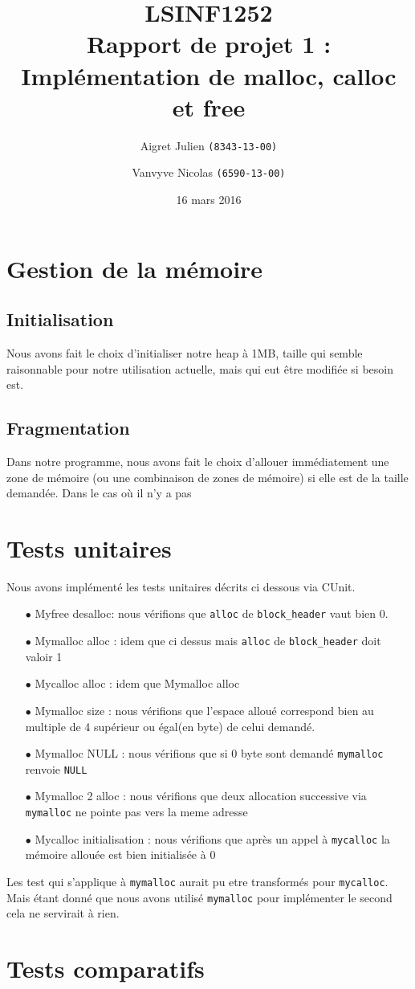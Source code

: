 \documentclass[10pt,a4paper]{article}
\author{Aigret Julien \texttt{(8343-13-00)}\and Vanvyve Nicolas \texttt{(6590-13-00)}}
\date{16 mars 2016}
\title{LSINF1252\\Rapport de projet 1 :\\Implémentation de malloc, calloc et free}
\begin{document}
\maketitle

\section{Gestion de la mémoire}
\subsection{Initialisation}
Nous avons fait le choix d'initialiser notre heap à 1MB, taille qui semble raisonnable pour notre utilisation actuelle, mais qui eut être modifiée si besoin est.

\subsection{Fragmentation}
Dans notre programme, nous avons fait le choix d'allouer immédiatement une zone de mémoire (ou une combinaison de zones de mémoire) si elle est de la taille demandée. Dans le cas où il n'y a pas
\section{Tests unitaires}


Nous avons implémenté les tests unitaires décrits ci dessous via CUnit. 
\begin{itemize}
	\item [$\bullet$] Myfree desalloc: nous vérifions que \texttt{alloc} de \texttt{block\_header} vaut bien 0.
	\item [$\bullet$] Mymalloc alloc : idem que ci dessus mais \texttt{alloc} de \texttt{block\_header} doit valoir 1
	\item [$\bullet$] Mycalloc alloc : idem que Mymalloc alloc
	\item [$\bullet$] Mymalloc size : nous vérifions que l'espace alloué correspond bien au multiple de 4 supérieur ou égal(en byte) de celui demandé. 
	\item [$\bullet$] Mymalloc NULL : nous vérifions que si 0 byte sont demandé \texttt{mymalloc} renvoie \texttt{NULL}
	\item [$\bullet$] Mymalloc 2 alloc : nous vérifions que deux allocation successive via \texttt{mymalloc} ne pointe pas vers la meme adresse
	\item [$\bullet$] Mycalloc initialisation : nous vérifions que après un appel à \texttt{mycalloc} la mémoire allouée est bien initialisée à 0 
\end{itemize} 
Les test qui s'applique à \texttt{mymalloc} aurait pu etre transformés pour \texttt{mycalloc}. Mais étant donné que nous avons utilisé \texttt{mymalloc} pour implémenter le second cela ne servirait à rien.

\section{Tests comparatifs}
\end{document}
